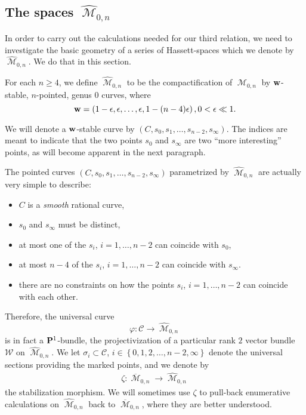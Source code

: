 \documentclass[12pt,reqno]{amsart}
\DeclareMathOperator{\M}{\mathcal{M}}
\renewcommand{\to}{{\longrightarrow}}
\numberwithin{equation}{section}
\newcommand{\cC}{\mathcal{C}}
\newcommand{\hM}{\widehat{\M}}
\begin{document}
\subsection{The spaces $\hM_{0,n}$}
\label{sec:spaces-hm_0-n}

In order to carry out the calculations needed for our third relation,
we need to investigate the basic geometry of a series of
Hassett-spaces which we denote by $\hM_{0,n}$.  We do that in this
section.

\begin{definition}
  \label{def:hM0n} For each $n \geq 4$, we define $\hM_{0,n}$ to be
  the compactification of $\M_{0,n}$ by ${\bf w}$-stable, $n$-pointed,
  genus $0$ curves, where
  $${\bf w} = \left(1- \epsilon, \epsilon, \dots, \epsilon, 1-(n-4)\epsilon \right), 0 < \epsilon \ll 1.$$
\end{definition}

We will denote a ${\bf w}$-stable curve by
$(C, s_{0}, s_{1}, \dots, s_{n-2}, s_{\infty})$.  The indices are
meant to indicate that the two points $s_{0}$ and $s_{\infty}$ are two
``more interesting'' points, as will become apparent in the next
paragraph.

The pointed curves $(C, s_{0}, s_{1}, \dots, s_{n-2}, s_{\infty})$
parametrized by $\hM_{0,n}$ are actually very simple to describe:

\begin{itemize}
\item $C$ is a {\sl smooth} rational curve,
\item $s_{0}$ and $s_{\infty}$ must be distinct,
\item at most one of the $s_{i}$, $i=1, \dots, n-2$ can coincide with
  $s_{0}$,
\item at most $n-4$ of the $s_{i}$, $i=1, \dots, n-2$ can coincide
  with $s_{\infty}$.
\item there are no constraints on how the points $s_{i}$,
  $i=1, \dots, n-2$ can coincide with each other.
\end{itemize}
Therefore, the universal curve $$\varphi: \cC \to \hM_{0,n}$$ is in
fact a $\P^{1}$-bundle, the projectivization of a particular rank $2$
vector bundle $\mathcal{W}$ on $\hM_{0,n}$. We let
$\sigma_{i} \subset \cC$,
$i \in \left\{0,1,2, \dots, n-2, \infty\right\}$ denote the universal
sections providing the marked points, and we denote by
\begin{align}
  \label{eq:stab}
  \zeta: \overline{\M}_{0,n} \to \hM_{0,n}
\end{align}
the stabilization morphism.  We will sometimes use $\zeta$ to
pull-back enumerative calculations on $\hM_{0,n}$ back to
$\overline{\M}_{0,n}$, where they are better understood.
\end{document}
